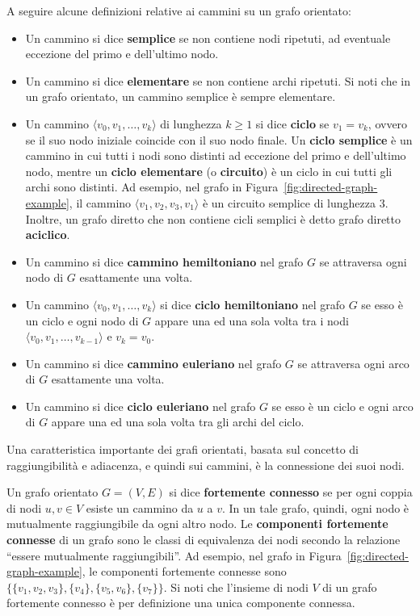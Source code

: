 A seguire alcune definizioni relative ai cammini su un grafo orientato:

\begin{itemize}
    \item Un cammino si dice \textbf{semplice} se non contiene nodi ripetuti, ad eventuale eccezione del primo e
    dell'ultimo nodo.
    \item Un cammino si dice \textbf{elementare} se non contiene archi ripetuti. Si noti che in un grafo orientato, un
    cammino semplice \`e sempre elementare.
    \item Un cammino $\langle v_0, v_1, \ldots, v_k \rangle$ di lunghezza $k \geq 1$ si dice \textbf{ciclo} se $v_1 = v_k$, ovvero se il
    suo nodo iniziale coincide con il suo nodo finale.
    Un \textbf{ciclo semplice} \`e un cammino in cui tutti i nodi sono distinti ad eccezione del primo e dell'ultimo
    nodo, mentre un \textbf{ciclo elementare} (o \textbf{circuito}) \`e un ciclo in cui tutti gli archi sono distinti.
    Ad esempio, nel grafo in Figura~\ref{fig:directed-graph-example}, il cammino $\langle v_1, v_2, v_3, v_1 \rangle$
    \`e un circuito semplice di lunghezza $3$.
    Inoltre, un grafo diretto che non contiene cicli semplici \`e detto grafo diretto \textbf{aciclico}.
    \item Un cammino si dice \textbf{cammino hemiltoniano} nel grafo $G$ se attraversa ogni nodo di $G$ esattamente
    una volta.
    \item Un cammino $\langle v_0, v_1, \ldots, v_k \rangle$ si dice \textbf{ciclo hemiltoniano} nel grafo $G$ se
    esso \`e un ciclo e ogni nodo di $G$ appare una ed una sola volta tra i nodi $\langle v_0, v_1, \ldots,
    v_{k-1}\rangle$ e $v_k = v_0$.
    \item Un cammino si dice \textbf{cammino euleriano} nel grafo $G$ se attraversa ogni arco di $G$ esattamente una
    volta.
    \item Un cammino si dice \textbf{ciclo euleriano} nel grafo $G$ se esso \`e un ciclo e ogni arco di $G$ appare una
    ed una sola volta tra gli archi del ciclo.
\end{itemize}


Una caratteristica importante dei grafi orientati, basata sul concetto di raggiungibilit\`a e adiacenza, e quindi
sui cammini, \`e la connessione dei suoi nodi.
\newline

Un grafo orientato $G = (V, E)$ si dice \textbf{fortemente connesso} se per ogni coppia di nodi $u, v \in V$ esiste un
cammino da $u$ a $v$.
In un tale grafo, quindi, ogni nodo \`e mutualmente raggiungibile da ogni altro nodo. \newline
Le \textbf{componenti fortemente connesse} di un grafo sono le classi di equivalenza dei nodi secondo la relazione
``essere mutualmente raggiungibili''.
Ad esempio, nel grafo in Figura~\ref{fig:directed-graph-example}, le componenti fortemente connesse sono
$\{\{v_1, v_2, v_3\}, \{v_4\}, \{v_5, v_6\}, \{v_7\}\}$.
Si noti che l'insieme di nodi $V$ di un grafo fortemente connesso \`e per definizione una unica componente connessa.
\newline

